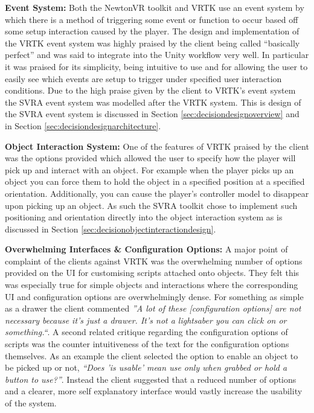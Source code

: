 \documentclass{l4proj}
\begin{document}
\textbf{Event System:}
Both the NewtonVR toolkit and VRTK use an event system by which there is a method of triggering some event or function to occur based off some setup interaction caused by the player. The design and implementation of the VRTK event system was highly praised by the client being called ``basically perfect'' and was said to integrate into the Unity workflow very well. In particular it was praised for its simplicity, being intuitive to use and for allowing the user to easily see which events are setup to trigger under specified user interaction conditions. Due to the high praise given by the client to VRTK's event system the SVRA event system was modelled after the VRTK system. This is design of the SVRA event system is discussed in Section \ref{sec:decisiondesignoverview} and in Section \ref{sec:decisiondesignarchitecture}.

\textbf{Object Interaction System:}
One of the features of VRTK praised by the client was the options provided which allowed the user to specify how the player will pick up and interact with an object. For example when the player picks up an object you can force them to hold the object in a specified position at a specified orientation. Additionally, you can cause the player's controller model to disappear upon picking up an object. As such the SVRA toolkit chose to implement such positioning and orientation directly into the object interaction system as is discussed in Section  \ref{sec:decisionobjectinteractiondesign}.

\textbf{Overwhelming Interfaces \& Configuration Options:}
A major point of complaint of the clients against VRTK was the overwhelming number of options provided on the UI for customising scripts attached onto objects. They felt this was especially true for simple objects and interactions where the corresponding UI and configuration options are overwhelmingly dense. For something as simple as a drawer the client commented \textit{''A lot of these [configuration options] are not necessary because it’s just a drawer. It's not a lightsaber you can click on or something.``}. A second related critique regarding the configuration options of scripts was the counter intuitiveness of the text for the configuration options themselves. As an example the client selected the option to enable an object to be picked up or not, \textit{``Does 'is usable' mean use only when grabbed or hold a button to use?''}. Instead the client suggested that a reduced number of options and a clearer, more self explanatory interface would vastly increase the usability of the system. 
\end{document}
